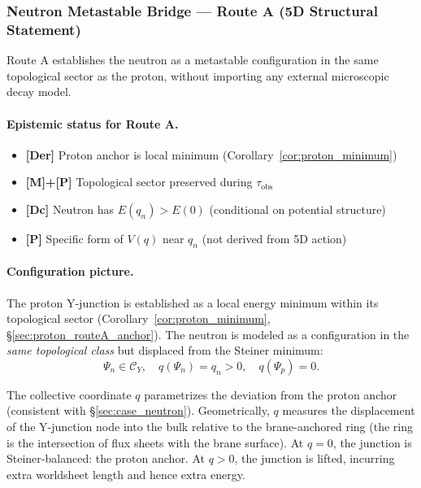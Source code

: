 
\subsubsection{Neutron Metastable Bridge --- Route A (5D Structural Statement)}
\label{subsec:neutron_routeA_structural}

Route A establishes the neutron as a metastable configuration in the same topological
sector as the proton, without importing any external microscopic decay model.

\paragraph{Epistemic status for Route A.}
\begin{itemize}[nosep]
  \item \textbf{[Der]} Proton anchor is local minimum (Corollary~\ref{cor:proton_minimum})
  \item \textbf{[M]+[P]} Topological sector preserved during $\tau_{\mathrm{obs}}$
  \item \textbf{[Dc]} Neutron has $E(q_n) > E(0)$ (conditional on potential structure)
  \item \textbf{[P]} Specific form of $V(q)$ near $q_n$ (not derived from 5D action)
\end{itemize}

\paragraph{Configuration picture.}

The proton Y-junction is established as a local energy minimum within its topological
sector (Corollary~\ref{cor:proton_minimum}, \S\ref{sec:proton_routeA_anchor}). The neutron
is modeled as a configuration in the \emph{same topological class} but displaced from
the Steiner minimum:
\begin{equation}
\label{eq:neutron_config_space}
\Psi_n \in \mathcal{C}_Y, \quad q(\Psi_n) = q_n > 0, \quad q(\Psi_p) = 0.
\end{equation}

The collective coordinate $q$ parametrizes the deviation from the proton anchor
(consistent with \S\ref{sec:case_neutron}).
Geometrically, $q$ measures the displacement of the Y-junction node into the bulk
relative to the brane-anchored ring (the ring is the intersection of flux sheets
with the brane surface). At $q = 0$, the junction is Steiner-balanced: the proton anchor.
At $q > 0$, the junction is lifted, incurring extra worldsheet length and hence extra energy.


